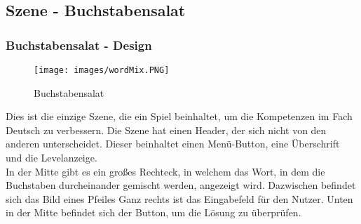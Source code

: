 \subsection{Szene - Buchstabensalat}
\subsubsection{Buchstabensalat - Design}
\begin{figure}[htbp]
  \centering
  \texttt{[image: images/wordMix.PNG]}
  \caption{Buchstabensalat}
  \label{wordMix}
\end{figure}
Dies ist die einzige Szene, die ein Spiel beinhaltet, um die Kompetenzen im Fach Deutsch zu verbessern. Die Szene hat einen Header, der sich nicht von den anderen unterscheidet. Dieser beinhaltet einen Menü-Button, eine Überschrift und die Levelanzeige.\\
In der Mitte gibt es ein großes Rechteck, in welchem das Wort, in dem die Buchstaben durcheinander gemischt werden, angezeigt wird. Dazwischen befindet sich das Bild eines Pfeiles\autocite{arrow}
Ganz rechts ist das Eingabefeld für den Nutzer. Unten in der Mitte befindet sich der Button, um die Lösung zu überprüfen.
